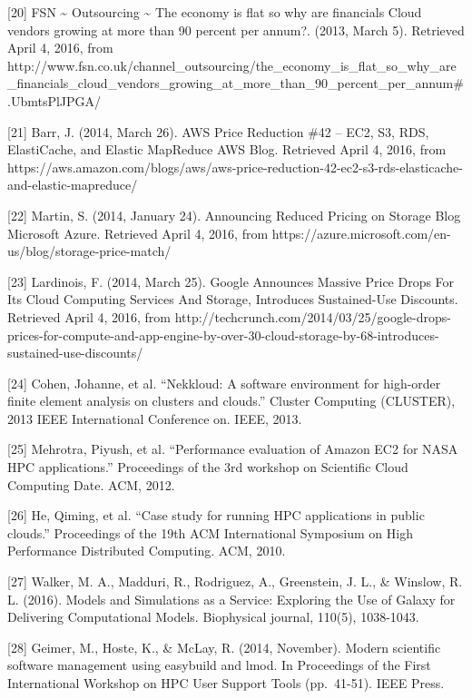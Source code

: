 \documentclass[]{article}
\begin{document}
{[}20{]} FSN \textasciitilde{} Outsourcing \textasciitilde{} The economy
is flat so why are financials Cloud vendors growing at more than 90
percent per annum?. (2013, March 5). Retrieved April 4, 2016, from
http://www.fsn.co.uk/channel\_outsourcing/the\_economy\_is\_flat\_so\_why\_are\_financials\_cloud\_vendors\_growing\_at\_more\_than\_90\_percent\_per\_annum\#.UbmtsPlJPGA/

{[}21{]} Barr, J. (2014, March 26). AWS Price Reduction \#42 -- EC2, S3,
RDS, ElastiCache, and Elastic MapReduce \textbar{} AWS Blog. Retrieved
April 4, 2016, from
https://aws.amazon.com/blogs/aws/aws-price-reduction-42-ec2-s3-rds-elasticache-and-elastic-mapreduce/

{[}22{]} Martin, S. (2014, January 24). Announcing Reduced Pricing on
Storage \textbar{} Blog \textbar{} Microsoft Azure. Retrieved April 4,
2016, from https://azure.microsoft.com/en-us/blog/storage-price-match/

{[}23{]} Lardinois, F. (2014, March 25). Google Announces Massive Price
Drops For Its Cloud Computing Services And Storage, Introduces
Sustained-Use Discounts. Retrieved April 4, 2016, from
http://techcrunch.com/2014/03/25/google-drops-prices-for-compute-and-app-engine-by-over-30-cloud-storage-by-68-introduces-sustained-use-discounts/

{[}24{]} Cohen, Johanne, et al. ``Nekkloud: A software environment for
high-order finite element analysis on clusters and clouds.'' Cluster
Computing (CLUSTER), 2013 IEEE International Conference on. IEEE, 2013.

{[}25{]} Mehrotra, Piyush, et al. ``Performance evaluation of Amazon EC2
for NASA HPC applications.'' Proceedings of the 3rd workshop on
Scientific Cloud Computing Date. ACM, 2012.

{[}26{]} He, Qiming, et al. ``Case study for running HPC applications in
public clouds.'' Proceedings of the 19th ACM International Symposium on
High Performance Distributed Computing. ACM, 2010.

{[}27{]} Walker, M. A., Madduri, R., Rodriguez, A., Greenstein, J. L.,
\& Winslow, R. L. (2016). Models and Simulations as a Service: Exploring
the Use of Galaxy for Delivering Computational Models. Biophysical
journal, 110(5), 1038-1043.

{[}28{]} Geimer, M., Hoste, K., \& McLay, R. (2014, November). Modern
scientific software management using easybuild and lmod. In Proceedings
of the First International Workshop on HPC User Support Tools
(pp.~41-51). IEEE Press.
\end{document}
